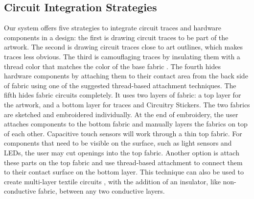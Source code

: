 \documentclass[header.tex]{subfiles}
\begin{document}
\subsection{Circuit Integration Strategies}
Our system offers five strategies to integrate circuit traces and hardware components in a design: the first is drawing circuit traces to be part of the artwork. The second is drawing circuit traces close to art outlines, which makes traces less obvious.
The third is camouflaging traces by insulating them with a thread color that matches the color of the base fabric \cite{Buechley2009}. %
The fourth hides hardware components by attaching them to their contact area from the back side of fabric using one of the suggested thread-based attachment techniques. The fifth hides fabric circuits completely. It uses two layers of fabric: a top layer for the artwork, and a bottom layer for traces and Circuitry Stickers. The two fabrics are sketched and embroidered individually. At the end of embroidery, the user attaches components to the bottom fabric and manually layers the fabrics on top of each other. Capacitive touch sensors will work through a thin top fabric. For components that need to be visible on the surface, such as light sensors and LEDs, the user may cut openings into the top fabric. Another option is attach these parts on the top fabric and use thread-based attachment to connect them to their contact surface on the bottom layer. This technique can also be used to create multi-layer textile circuits \cite{Dunne:2012:MEC:2370216.2370348, 5387040}, with the addition of an insulator, like non-conductive fabric, between any two conductive layers. 



   
   
\end{document}
